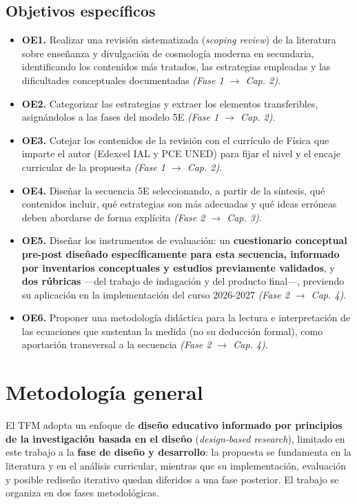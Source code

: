 \subsection{Objetivos específicos}

\begin{itemize}
\item \textbf{OE1.} Realizar una revisión sistematizada (\textit{scoping review}) de la literatura sobre enseñanza y divulgación de cosmología moderna en secundaria, identificando los contenidos más tratados, las estrategias empleadas y las dificultades conceptuales documentadas \textit{(Fase 1 $\rightarrow$ Cap. 2)}.
\item \textbf{OE2.} Categorizar las estrategias y extraer los elementos transferibles, asignándolos a las fases del modelo 5E \textit{(Fase 1 $\rightarrow$ Cap. 2)}.
\item \textbf{OE3.} Cotejar los contenidos de la revisión con el currículo de Física que imparte el autor (Edexcel IAL y PCE UNED) para fijar el nivel y el encaje curricular de la propuesta \textit{(Fase 1 $\rightarrow$ Cap. 2)}.
\item \textbf{OE4.} Diseñar la secuencia 5E seleccionando, a partir de la síntesis, qué contenidos incluir, qué estrategias son más adecuadas y qué ideas erróneas deben abordarse de forma explícita \textit{(Fase 2 $\rightarrow$ Cap. 3)}.
\item \textbf{OE5.} Diseñar los instrumentos de evaluación: un \textbf{cuestionario conceptual pre-post diseñado específicamente para esta secuencia, informado por inventarios conceptuales y estudios previamente validados}, y \textbf{dos rúbricas} ---del trabajo de indagación y del producto final---, previendo su aplicación en la implementación del curso 2026-2027 \textit{(Fase 2 $\rightarrow$ Cap. 4)}.
\item \textbf{OE6.} Proponer una metodología didáctica para la lectura e interpretación de las ecuaciones que sustentan la medida (no su deducción formal), como aportación transversal a la secuencia \textit{(Fase 2 $\rightarrow$ Cap. 4)}.
\end{itemize}

\section{Metodología general}\label{sec:metodologia}

El TFM adopta un enfoque de \textbf{diseño educativo informado por principios de la investigación basada en el diseño} (\textit{design-based research}), limitado en este trabajo a la \textbf{fase de diseño y desarrollo}: la propuesta se fundamenta en la literatura y en el análisis curricular, mientras que su implementación, evaluación y posible rediseño iterativo quedan diferidos a una fase posterior. El trabajo se organiza en dos fases metodológicas.

